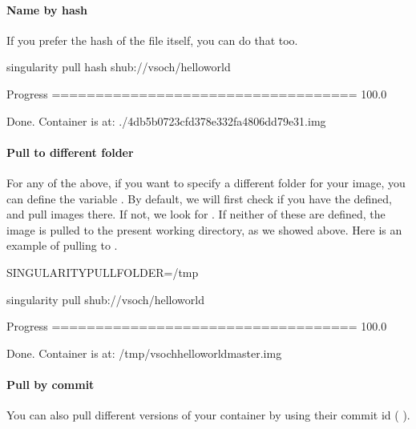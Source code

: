 \documentclass[letterpaper,10pt,english]{sphinxmanual}
\begin{document}
\paragraph{Name by hash}
\label{\detokenize{appendix:name-by-hash}}
If you prefer the hash of the file itself, you can do that too.

%
\begin{sphinxVerbatim}[commandchars=\\\{\}]
singularity pull \PYGZhy{}\PYGZhy{}hash shub://vsoch/hello\PYGZhy{}world

Progress \textbar{}===================================\textbar{} 100.0\PYGZpc{}

Done. Container is at: ./4db5b0723cfd378e332fa4806dd79e31.img
\end{sphinxVerbatim}


\paragraph{Pull to different folder}
\label{\detokenize{appendix:pull-to-different-folder}}
For any of the above, if you want to specify a different folder for
your image, you can define the variable . By default, we will first
check if you have the  defined, and pull images there. If not, we look
for . If neither of these are defined, the image is pulled to the
present working directory, as we showed above. Here is an example of
pulling to  .

%
\begin{sphinxVerbatim}[commandchars=\\\{\}]
SINGULARITY\PYGZus{}PULLFOLDER=/tmp

singularity pull shub://vsoch/hello\PYGZhy{}world

Progress \textbar{}===================================\textbar{} 100.0\PYGZpc{}

Done. Container is at: /tmp/vsoch\PYGZhy{}hello\PYGZhy{}world\PYGZhy{}master.img
\end{sphinxVerbatim}


\paragraph{Pull by commit}
\label{\detokenize{appendix:pull-by-commit}}
You can also pull different versions of your container by using their
commit id (  ).
\end{document}
